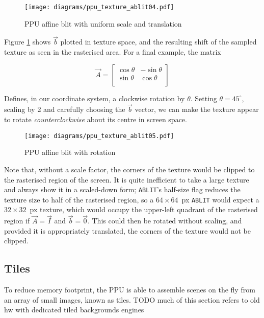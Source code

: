 \begin{figure}[H]
\centering
\caption{PPU affine blit with uniform scale and translation}
\label{diagram:ppu_texture_ablit04}
\texttt{[image: diagrams/ppu\_texture\_ablit04.pdf]}
\end{figure}

Figure \ref{diagram:ppu_texture_ablit04} shows $\vec{b}$ plotted in texture space, and the resulting shift of the sampled texture as seen in the rasterised area. For a final example, the matrix

\[
\vec{A} = \begin{bmatrix}
\cos\theta & -\sin\theta \\
\sin\theta & \cos\theta \\
\end{bmatrix}
\]

Defines, in our coordinate system, a clockwise rotation by $\theta$. Setting $\theta=45^{\circ}$, scaling by 2 and carefully choosing the $\vec{b}$ vector, we can make the texture appear to rotate {\it counterclockwise} about its centre in screen space.

\begin{figure}[H]
\centering
\caption{PPU affine blit with rotation}
\label{diagram:ppu_texture_ablit05}
\texttt{[image: diagrams/ppu\_texture\_ablit05.pdf]}
\end{figure}

Note that, without a scale factor, the corners of the texture would be clipped to the rasterised region of the screen. It is quite inefficient to take a large texture and always show it in a scaled-down form; {\tt ABLIT}'s half-size flag reduces the texture size to half of the rasterised region, so a $64\times 64$~px {\tt ABLIT} would expect a $32\times 32$~px texture, which would occupy the upper-left quadrant of the rasterised region if $\vec{A}=\vec{I}$ and $\vec{b}=\vec{0}$. This could then be rotated without scaling, and provided it is appropriately translated, the corners of the texture would not be clipped.

\subsection{Tiles}
\label{section:tiles}

To reduce memory footprint, the PPU is able to assemble scenes on the fly from an array of small images, known as tiles. TODO much of this section refers to old hw with dedicated tiled backgrounds engines

